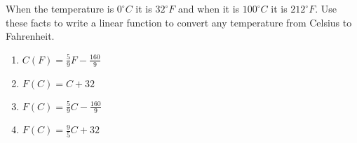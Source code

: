 \bigskip

\item When the temperature is $0^\circ C$ it is $32^\circ F$ and when it is $100^\circ C$ it is $212 ^\circ F$.  Use these facts to write a linear function to convert any temperature from Celsius to Fahrenheit.

    \begin{enumerate}
    \item $C(F)=\frac{5}{9}F-\frac{160}{9}$
    \item $F(C)=C+32$
    \item $F(C)=\frac{5}{9}C-\frac{160}{9}$
    \item $F(C)=\frac{9}{5}C+32$
    \end{enumerate}
    


